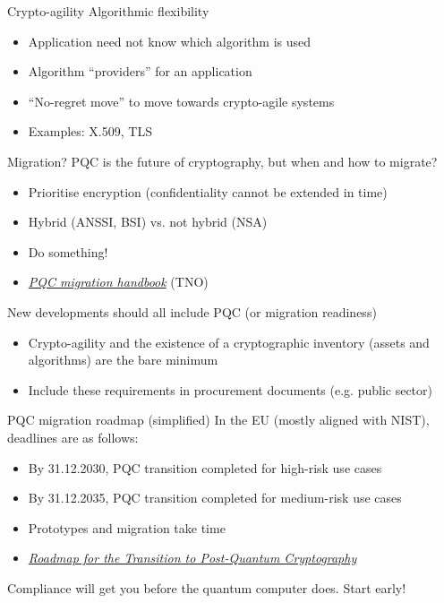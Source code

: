 \begin{frame}{Crypto-agility}
  Algorithmic flexibility
  \begin{itemize}[<+(1)->]
    \item Application need not know which algorithm is used
    \item Algorithm \enquote{providers} for an application
    \item \enquote{No-regret move} to move towards crypto-agile systems
    \item Examples: X.509, TLS
  \end{itemize}
\end{frame}

\begin{frame}{Migration?}
  PQC is the future of cryptography, but when and how to migrate?
  \begin{itemize}[<+(1)->]
    \item Prioritise encryption (confidentiality cannot be extended in time)
    \item Hybrid (ANSSI, BSI) vs. not hybrid (NSA)
    \item Do something!
    \item \href{https://www.tno.nl/en/newsroom/2024/12/renewed-handbook-quantum-safe-crypto/}{\textit{PQC migration handbook}} (TNO)
  \end{itemize}

  \vspace*{1em}

  \pause
  New developments should all include PQC (or migration readiness)
  \begin{itemize}[<+(1)->]
    \item Crypto-agility and the existence of a cryptographic inventory (assets and algorithms) are the bare minimum
    \item Include these requirements in procurement documents (e.g. public sector)
  \end{itemize}
\end{frame}

\begin{frame}{PQC migration roadmap (simplified)}
  In the EU (mostly aligned with NIST), deadlines are as follows:
  \begin{itemize}[<+(1)->]
    \item By 31.12.2030, PQC transition completed for high-risk use cases
    \item By 31.12.2035, PQC transition completed for medium-risk use cases
    \item Prototypes and migration take time
    \item \href{https://digital-strategy.ec.europa.eu/en/library/coordinated-implementation-roadmap-transition-post-quantum-cryptography}{\textit{Roadmap for the Transition to Post-Quantum Cryptography}}
  \end{itemize}

  \vspace{1em}
  \pause
  Compliance will get you before the quantum computer does.
  Start early!
\end{frame}

